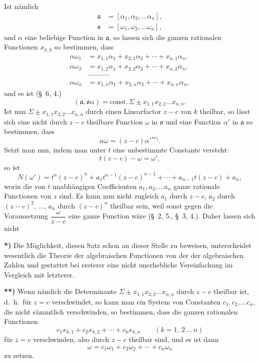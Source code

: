 \documentclass{article}
\begin{document}
Ist nämlich
\[ \begin{aligned} \mathfrak{a} &= [\alpha_{1}, \alpha_{2}, \ldots \alpha_{n}], \\ \mathfrak{o} &= [\omega_{1}, \omega_{2}, \ldots \omega_{n}], \end{aligned} \]
und $\alpha$ eine beliebige Function in $\mathfrak{a}$, so lassen sich die ganzen rationalen Functionen $x_{h,k}$ so bestimmen, dass
\[ \begin{aligned} \alpha\omega_{1} &= x_{1,1}\alpha_{1} + x_{2,1}\alpha_{2} + \cdots + x_{n,1}\alpha_{n}, \\ \alpha\omega_{2} &= x_{1,2}\alpha_{1} + x_{2,2}\alpha_{2} + \cdots + x_{n,2}\alpha_{n}, \\ &\cdots\cdots\cdots\cdots \\ \alpha\omega_{n} &= x_{1,n}\alpha_{1} + x_{2,n}\alpha_{2} + \cdots + x_{n,n}\alpha_{n}, \end{aligned} \]
und es ist (§~6, 4.)
\[ (\mathfrak{a}, \mathfrak{o}\alpha) = \text{const.}\,\Sigma \pm x_{1,1}x_{2,2}\ldots x_{n,n}. \]
Ist nun $\Sigma \pm x_{1,1}x_{2,2}\ldots x_{n,n}$ durch einen Linearfactor $z-c$ von $k$ theilbar, so lässt sich eine nicht durch $z-c$ theilbare Function $\omega$ in $\mathfrak{o}$ und eine Function $\alpha'$ in $\mathfrak{a}$ so bestimmen, dass
\[ \alpha\omega = (z-c)\alpha'{}^{**)}. \]
Setzt man nun, indem man unter $t$ eine unbestimmte Constante versteht:
\[ t(z-c) - \omega = \omega', \]
so ist
\[ N(\omega') = t^{n}(z-c)^{n} + a_{1}t^{n-1}(z-c)^{n-1} + \cdots + a_{n-1}t(z-c) + a_{n}, \]
worin die von $t$ unabhängigen Coefficienten $a_{1}, a_{2}, \ldots a_{n}$ ganze rationale Functionen von $z$ sind. Es kann nun nicht zugleich $a_{1}$ durch $z-c$, $a_{2}$ durch $(z-c)^{2}$, $\ldots$, $a_{n}$ durch $(z-c)^{n}$ theilbar sein, weil sonst gegen die Voraussetzung $\dfrac{\omega}{z-c}$ eine ganze Function wäre (§~2, 5., §~3, 4.). Daher lassen sich nicht

\textbf{*)} Die Möglichkeit, diesen Satz schon an dieser Stelle zu beweisen, unterscheidet wesentlich die Theorie der algebraischen Functionen von der der algebraischen Zahlen und gestattet bei ersterer eine nicht unerhebliche Vereinfachung im Vergleich mit letzterer.

\textbf{**)} Wenn nämlich die Determinante $\Sigma \pm x_{1,1}x_{2,2}\ldots x_{n,n}$ durch $z-c$ theilbar ist, d.\ h.\ für $z = c$ verschwindet, so kann man ein System von Constanten $c_{1}, c_{2}, \ldots c_{n}$, die nicht sämmtlich verschwinden, so bestimmen, dass die ganzen rationalen Functionen
\[ c_{1}x_{k,1} + c_{2}x_{k,2} + \cdots + c_{k}x_{k,n} \qquad {\scriptstyle (k = 1,\, 2\, \ldots\, n)} \]
für $z = c$ verschwinden, also durch $z-c$ theilbar sind, und es ist dann
\[ \omega = c_{1}\omega_{1} + c_{2}\omega_{2} + \cdots + c_{n}\omega_{n} \]
zu setzen.
\end{document}
